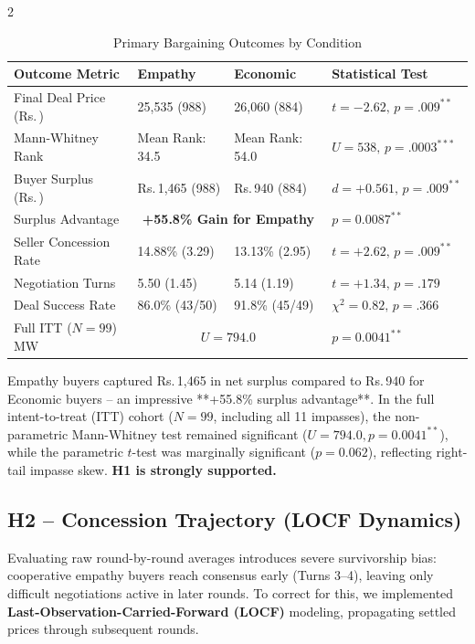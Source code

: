 \documentclass[10pt,a4paper]{article}
\newcommand{\rs}{\textsf{Rs.\,}}
\begin{document}
\begin{multicols}{2}
\begin{table}[H]
\centering
\scriptsize
\caption{Primary Bargaining Outcomes by Condition}
\label{tab:outcomes}
\setlength{\tabcolsep}{3pt}
\renewcommand{\arraystretch}{1.18}
\begin{tabular}{@{}lp{1.6cm}p{1.6cm}p{1.7cm}@{}}
\toprule
\textbf{Outcome Metric} & \textbf{Empathy} & \textbf{Economic} & \textbf{Statistical Test} \\
\midrule
Final Deal Price (\rs)  & 25,535 (988)     & 26,060 (884)      & $t = -2.62,\,p = .009^{**}$ \\
Mann-Whitney Rank       & Mean Rank: 34.5  & Mean Rank: 54.0   & $U = 538,\,p = .0003^{***}$ \\
Buyer Surplus (\rs)     & \rs1,465 (988)   & \rs940 (884)      & $d = +0.561,\,p = .009^{**}$ \\
Surplus Advantage       & \multicolumn{2}{c}{\textbf{+55.8\% Gain for Empathy}} & $p = 0.0087^{**}$ \\
Seller Concession Rate  & 14.88\% (3.29)   & 13.13\% (2.95)    & $t = +2.62,\,p = .009^{**}$ \\
Negotiation Turns       & 5.50 (1.45)      & 5.14 (1.19)       & $t = +1.34,\,p = .179$ \\
Deal Success Rate       & 86.0\% (43/50)   & 91.8\% (45/49)    & $\chi^2 = 0.82,\,p = .366$ \\
Full ITT ($N=99$) MW    & \multicolumn{2}{c}{$U = 794.0$}      & $p = 0.0041^{**}$ \\
\bottomrule
\end{tabular}
\end{table}

Empathy buyers captured \rs1,465 in net surplus compared to \rs940 for Economic buyers -- an impressive **+55.8\% surplus advantage**. In the full intent-to-treat (ITT) cohort ($N = 99$, including all 11 impasses), the non-parametric Mann-Whitney test remained significant ($U = 794.0, p = 0.0041^{**}$), while the parametric $t$-test was marginally significant ($p = 0.062$), reflecting right-tail impasse skew. \textbf{H1 is strongly supported.}

\subsection{H2 -- Concession Trajectory (LOCF Dynamics)}

Evaluating raw round-by-round averages introduces severe survivorship bias: cooperative empathy buyers reach consensus early (Turns 3--4), leaving only difficult negotiations active in later rounds. To correct for this, we implemented \textbf{Last-Observation-Carried-Forward (LOCF)} modeling, propagating settled prices through subsequent rounds.


\end{multicols}
\end{document}
